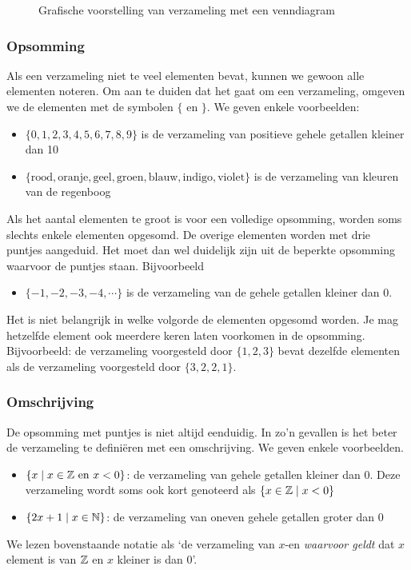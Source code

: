 \begin{figure}[htbp]
\centering
{}\qquad
{}
\caption{Grafische voorstelling van verzameling met een venndiagram}
\label{fig:venndiagram}
\end{figure}

\subsubsection{Opsomming}
Als een verzameling niet te veel elementen bevat, kunnen we gewoon alle elementen noteren. Om aan te duiden dat het gaat om een verzameling, omgeven we de elementen met de symbolen $\{$ en $\}$. We geven enkele voorbeelden:
\begin{itemize}
\item $\{0,1,2,3,4,5,6,7,8,9\}$ is de verzameling van positieve gehele getallen kleiner dan 10
\item $\{ \mathrm{ rood, oranje, geel, groen, blauw, indigo, violet}\}$ is de verzameling van kleuren van de regenboog
\end{itemize}
Als het aantal elementen te groot is voor een volledige opsomming, worden soms slechts enkele elementen opgesomd. De overige elementen worden met drie puntjes aangeduid. Het moet dan wel duidelijk zijn uit de beperkte opsomming waarvoor de puntjes staan. Bijvoorbeeld
\begin{itemize}
\item $\{-1,-2,-3,-4,\cdots \}$ is de verzameling van de gehele getallen kleiner dan 0.
\end{itemize}

Het is niet belangrijk in welke volgorde de elementen opgesomd worden. Je mag hetzelfde element ook meerdere keren laten voorkomen in de opsomming. Bijvoorbeeld: de verzameling voorgesteld door $\{1,2,3\}$ bevat dezelfde elementen als de verzameling voorgesteld door $\{3,2,2,1\}$.

\subsubsection{Omschrijving}
De opsomming met puntjes is niet altijd eenduidig. In zo'n gevallen is het beter de verzameling te defini\"eren met een omschrijving. We geven enkele voorbeelden.
\begin{itemize}
\item $\{x\mid x \in \mathbb{Z} ~\mathrm{ en }~ x<0\}$: de verzameling van gehele getallen kleiner dan 0. Deze verzameling wordt soms ook kort genoteerd als $\{x \in \mathbb{Z} \mid x<0\}$
\item $\{ 2x +1 \mid x \in \mathbb{N}\}$: de verzameling van oneven gehele getallen groter dan 0
\end{itemize}
We lezen bovenstaande notatie als `de verzameling van $x$-en \emph{waarvoor geldt} dat $x$ element is van $\mathbb{Z}$ en $x$ kleiner is dan 0'.

